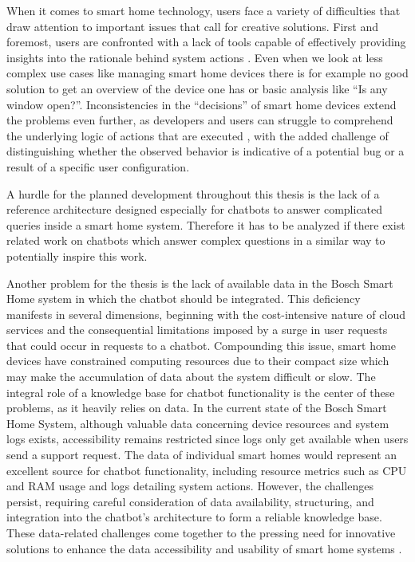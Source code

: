 When it comes to smart home technology, users face a variety of difficulties that draw attention to important issues that call for creative solutions. First and foremost, users are confronted with a lack of tools capable of effectively providing insights into the rationale behind system actions \cite{kok2022explainableartificialintelligencexai}.
Even when we look at less complex use cases like managing smart home devices there is for example no good solution to get an overview of the device one has or basic analysis like ``Is any window open?''.
Inconsistencies in the ``decisions'' of smart home devices extend the problems even further, as developers and users can struggle to comprehend the underlying logic of actions that are executed \cite{kok2022explainableartificialintelligencexai}, with the added challenge of distinguishing whether the observed behavior is indicative of a potential bug or a result of a specific user configuration.

A hurdle for the planned development throughout this thesis is the lack of a reference architecture designed especially for chatbots to answer complicated queries inside a smart home system.
Therefore it has to be analyzed if there exist related work on chatbots which answer complex questions in a similar way to potentially inspire this work.

Another problem for the thesis is the lack of available data in the Bosch Smart Home system in which the chatbot should be integrated.
This deficiency manifests in several dimensions, beginning with the cost-intensive nature of cloud services and the consequential limitations imposed by a surge in user requests that could occur in requests to a chatbot. 
Compounding this issue, smart home devices have constrained computing resources due to their compact size which may make the accumulation of data about the system difficult or slow. 
The integral role of a knowledge base for chatbot functionality is the center of these problems, as it heavily relies on data. 
In the current state of the Bosch Smart Home System, although valuable data concerning device resources and system logs exists, accessibility remains restricted since logs only get available when users send a support request.
The data of individual smart homes would represent an excellent source for chatbot functionality, including resource metrics such as CPU and RAM usage and logs detailing system actions.
However, the challenges persist, requiring careful consideration of data availability, structuring, and integration into the chatbot's architecture to form a reliable knowledge base. 
These data-related challenges come together to the pressing need for innovative solutions to enhance the data accessibility and usability of smart home systems \cite{7753232}.

